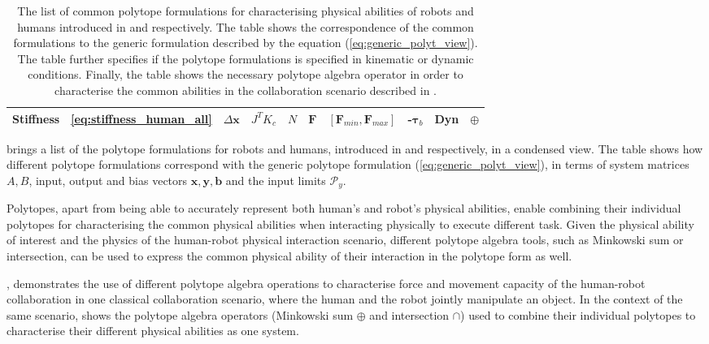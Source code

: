 \begin{table}[!b]
\begin{tabular}{|l|c|c|c|c|c|c|c|c|c|}
Stiffness & \ref{eq:stiffness_human_all} &$\Delta\bm{x}$ & $J^TK_c$ & $N$ & $\bm{F}$ & $[\bm{F}_{min},\bm{F}_{max}]$ & -$\bm{\tau}_b$ & Dyn & $\oplus$ \\
\hline
\end{tabular}
\caption{The list of common polytope formulations for characterising physical abilities of robots and humans introduced in  and  respectively. The table shows the correspondence of the common formulations to the generic formulation described by the equation (\ref{eq:generic_polyt_view}). The table further specifies if the polytope formulations is specified in kinematic or dynamic conditions. Finally, the table shows the necessary polytope algebra operator in order to characterise the common abilities in the collaboration scenario described in .}
\label{tab:merged_table}
\end{table}

 brings a list of the polytope formulations for robots and humans, introduced in  and  respectively, in a condensed view. The table shows how different polytope formulations correspond with the generic polytope formulation (\ref{eq:generic_polyt_view}), in terms of system matrices $A,B$, input, output and bias vectors $\bm{x},\bm{y},\bm{b}$ and the input limits $\mathcal{P}_y$.

Polytopes, apart from being able to accurately represent both human's and robot's physical abilities, enable combining their individual polytopes for characterising the common physical abilities when interacting physically to execute different task. Given the physical ability of interest and the physics of the human-robot physical interaction scenario, different polytope algebra tools, such as Minkowski sum or intersection, can be used to express the common physical ability of their interaction in the polytope form as well.


, demonstrates the use of different polytope algebra operations to characterise force and movement capacity of the human-robot collaboration in one classical collaboration scenario, where the human and the robot jointly manipulate an object. In the context of the same scenario,  shows the polytope algebra operators (Minkowski sum $\oplus$ and intersection $\cap$) used to combine their individual polytopes to characterise their different physical abilities as one system.


